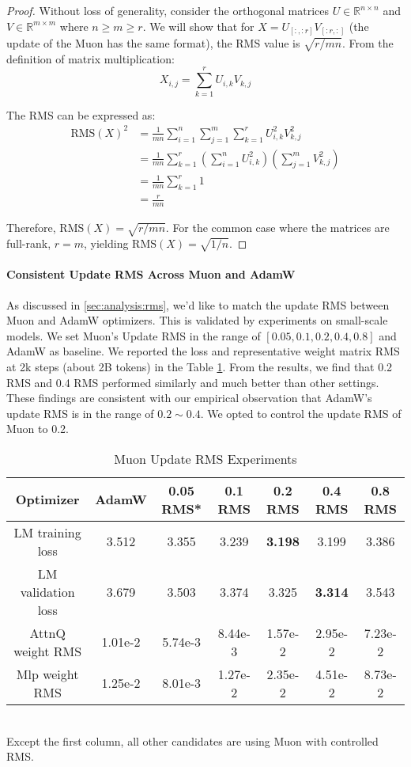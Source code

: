 \begin{proof}
Without loss of generality, consider the orthogonal matrices $U\in\mathbb{R}^{n\times n}$ and $V\in\mathbb{R}^{m\times m}$ where $n \geq m \geq r$. We will show that for $X=U_{[:,:r]}V_{[:r,:]}$ (the update of the Muon has the same format), the RMS value is $\sqrt{r/mn}$. From the definition of matrix multiplication:
$$X_{i,j}=\sum_{k=1}^r U_{i,k}V_{k,j}$$

The RMS can be expressed as:
$$\begin{aligned}
\text{RMS}(X)^2 &= \frac{1}{mn}\sum_{i=1}^n\sum_{j=1}^m \sum_{k=1}^r U_{i,k}^2V_{k,j}^2 \\
&= \frac{1}{mn}\sum_{k=1}^r\left(\sum_{i=1}^n U_{i,k}^2\right)\left(\sum_{j=1}^m V_{k,j}^2\right) \\
&= \frac{1}{mn}\sum_{k=1}^r 1 \\
&= \frac{r}{mn}
\end{aligned}$$

Therefore, $\text{RMS}(X)=\sqrt{r/mn}$. For the common case where the matrices are full-rank, $r=m$, yielding $\text{RMS}(X)=\sqrt{1/n}$.
\end{proof}


\paragraph{Consistent Update RMS Across Muon and AdamW}
As discussed in \ref{sec:analysis:rms}, we'd like to match the update RMS between Muon and AdamW optimizers. This is validated by experiments on small-scale models. We set Muon's Update RMS in the range of $[0.05, 0.1, 0.2, 0.4, 0.8]$ and AdamW as baseline. We reported the loss and representative weight matrix RMS at 2k steps (about 2B tokens) in the Table \ref{tab:muonrms}. From the results, we find that 0.2 RMS and 0.4 RMS performed similarly and much better than other settings. These findings are consistent with our empirical observation that AdamW's update RMS is in the range of $0.2\sim0.4$. We opted to control the update RMS of Muon to 0.2.


\begin{table}[ht]
\small
\centering
\caption{Muon Update RMS Experiments}
\label{tab:muonrms}
\begin{tabular}{c|c|c|c|c|c|c}
\toprule
Optimizer & AdamW & 0.05 RMS* & 0.1 RMS & 0.2 RMS & 0.4 RMS & 0.8 RMS\\
\midrule
LM training loss & 3.512 & 3.355 & 3.239 & \textbf{3.198} & 3.199 & 3.386  \\
LM validation loss & 3.679 & 3.503 & 3.374 & 3.325 & \textbf{3.314} & 3.543 \\
AttnQ weight RMS & 1.01e-2 & 5.74e-3 & 8.44e-3 & 1.57e-2 & 2.95e-2 & 7.23e-2 \\
Mlp weight RMS & 1.25e-2 & 8.01e-3 & 1.27e-2 & 2.35e-2 & 4.51e-2 & 8.73e-2 \\
\bottomrule
\end{tabular}
\\ \footnotesize{\small *Except the first column, all other candidates are using Muon with controlled RMS.} 
\end{table}


